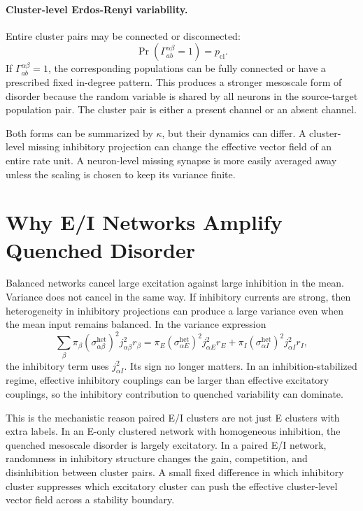 \paragraph{Cluster-level Erdos-Renyi variability.}
Entire cluster pairs may be connected or disconnected:
\begin{equation}
    \Pr\!\left(\Gamma_{ab}^{\alpha\beta}=1\right)=p_{\mathrm{cl}}.
    \label{eq:ch08-cluster-er}
\end{equation}
If \(\Gamma_{ab}^{\alpha\beta}=1\), the corresponding populations can be fully
connected or have a prescribed fixed in-degree pattern. This produces a
stronger mesoscale form of disorder because the random variable is shared by
all neurons in the source-target population pair. The cluster pair is either a
present channel or an absent channel.

Both forms can be summarized by \(\kappa\), but their dynamics can differ. A
cluster-level missing inhibitory projection can change the effective vector
field of an entire rate unit. A neuron-level missing synapse is more easily
averaged away unless the scaling is chosen to keep its variance finite.

\section{Why E/I Networks Amplify Quenched Disorder}
\label{sec:ch08-ei-amplification}

Balanced networks cancel large excitation against large inhibition in the mean.
Variance does not cancel in the same way. If inhibitory currents are strong,
then heterogeneity in inhibitory projections can produce a large variance even
when the mean input remains balanced. In the variance expression
\begin{equation}
    \sum_{\beta}
    \pi_\beta
    (\sigma_{\alpha\beta}^{\mathrm{het}})^2
    j_{\alpha\beta}^2 r_\beta
    =
    \pi_E
    (\sigma_{\alpha E}^{\mathrm{het}})^2
    j_{\alpha E}^2 r_E
    +
    \pi_I
    (\sigma_{\alpha I}^{\mathrm{het}})^2
    j_{\alpha I}^2 r_I,
    \label{eq:ch08-ei-variance-terms}
\end{equation}
the inhibitory term uses \(j_{\alpha I}^2\). Its sign no longer matters. In an
inhibition-stabilized regime, effective inhibitory couplings can be larger than
effective excitatory couplings, so the inhibitory contribution to quenched
variability can dominate.

This is the mechanistic reason paired E/I clusters are not just E clusters with
extra labels. In an E-only clustered network with homogeneous inhibition, the
quenched mesoscale disorder is largely excitatory. In a paired E/I network,
randomness in inhibitory structure changes the gain, competition, and
disinhibition between cluster pairs. A small fixed difference in which
inhibitory cluster suppresses which excitatory cluster can push the effective
cluster-level vector field across a stability boundary.

